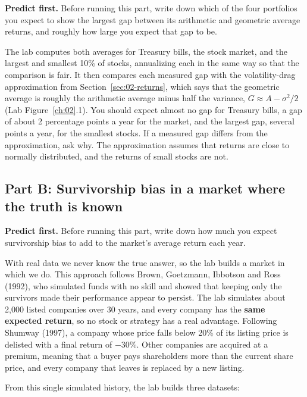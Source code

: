 \textbf{Predict first.} Before running this part, write down which of the four portfolios you expect to show the largest gap between its arithmetic and geometric average returns, and roughly how large you expect that gap to be.

The lab computes both averages for Treasury bills, the stock market, and the largest and smallest 10\% of stocks, annualizing each in the same way so that the comparison is fair. It then compares each measured gap with the volatility-drag approximation from Section~\ref{sec:02-returns}, which says that the geometric average is roughly the arithmetic average minus half the variance, $G \approx A - \sigma^2/2$ (Lab Figure~\ref{ch:02}.1). You should expect almost no gap for Treasury bills, a gap of about 2 percentage points a year for the market, and the largest gap, several points a year, for the smallest stocks. If a measured gap differs from the approximation, ask why. The approximation assumes that returns are close to normally distributed, and the returns of small stocks are not.

\subsection*{Part B: Survivorship bias in a market where the truth is known}

\textbf{Predict first.} Before running this part, write down how much you expect survivorship bias to add to the market's average return each year.

With real data we never know the true answer, so the lab builds a market in which we do. This approach follows Brown, Goetzmann, Ibbotson and Ross (1992), who simulated funds with no skill and showed that keeping only the survivors made their performance appear to persist. The lab simulates about 2,000 listed companies over 30 years, and every company has the \textbf{same expected return}, so no stock or strategy has a real advantage. Following Shumway (1997), a company whose price falls below 20\% of its listing price is delisted with a final return of $-30$\%. Other companies are acquired at a premium, meaning that a buyer pays shareholders more than the current share price, and every company that leaves is replaced by a new listing.

From this single simulated history, the lab builds three datasets:

